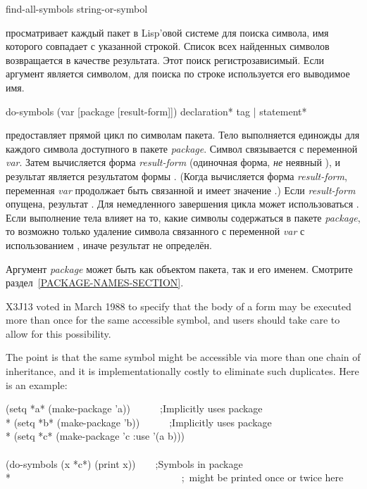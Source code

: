 \begin{defun}[Функция]
find-all-symbols string-or-symbol

 просматривает каждый пакет в Lisp'овой системе для поиска
символа, имя которого совпадает с указанной строкой. Список всех найденных
символов возвращается в качестве результата.
Этот поиск регистрозависимый.
Если аргумент является символом, для поиска по строке используется его выводимое
имя.
\end{defun}

\begin{defmac}
do-symbols (var [package [result-form]])
           {declaration}* {tag | statement}*

 предоставляет прямой цикл по символам пакета. Тело выполняется
единожды для каждого символа доступного в пакете \emph{package}. Символ
связывается с переменной \emph{var}.
Затем вычисляется форма \emph{result-form} (одиночная форма, \emph{не} неявный
), и результат является результатом формы . (Когда
вычисляется форма \emph{result-form}, переменная \emph{var} продолжает быть
связанной и имеет значение {\false}.) Если \emph{result-form} опущена, результат
{\false}. Для немедленного завершения цикла может использоваться
. Если выполнение тела влияет на то, какие символы содержаться в
пакете \emph{package}, то возможно только удаление символа связанного с
переменной \emph{var} с использованием , иначе результат
не определён.

Аргумент \emph{package} может быть как объектом пакета, так и его
именем. Смотрите раздел~\ref{PACKAGE-NAMES-SECTION}.

\begin{new}
X3J13 voted in March 1988
to specify that the body of a 
form may be executed more than once for the same accessible symbol, and users
should take care to allow for this possibility.

The point is that the same symbol might be accessible via more than one
chain of inheritance, and it is implementationally costly to eliminate
such duplicates.  Here is an example:
\begin{lisp}
(setq *a* (make-package 'a))~~~~~~;\textrm{Implicitly uses package } \\*
(setq *b* (make-package 'b))~~~~~~;\textrm{Implicitly uses package } \\*
(setq *c* (make-package 'c :use '(a b))) \\
\\
(do-symbols (x *c*) (print x))~~~~;\textrm{Symbols in package } \\*
~~~~~~~~~~~~~~~~~~~~~~~~~~~~~~~~~~;~\textrm{might be printed once or twice here}
\end{lisp}


\end{new}
\end{defmac}
